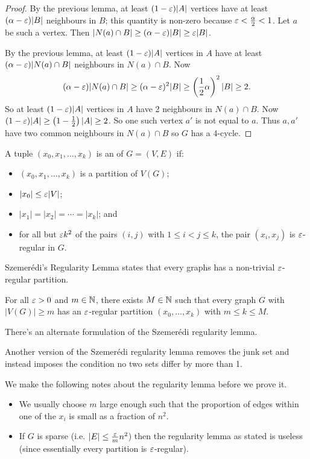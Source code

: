 \documentclass[main.tex]{subfiles}
\begin{document}
\begin{proof}
  By the previous lemma, at least $(1 - \varepsilon)|A|$ vertices have at least
  $(\alpha - \varepsilon)|B|$ neighbours in $B$; this quantity is non-zero because
  $\varepsilon < \frac\alpha 2 < 1$.
  Let $a$ be such a vertex.
  Then $|N(a)\cap B|\geq(\alpha - \varepsilon)|B|\geq\varepsilon|B|$.

  By the previous lemma, at least $(1 - \varepsilon)|A|$ vertices in $A$ have at least
  $(\alpha - \varepsilon)|N(a)\cap B|$ neighbours in $N(a)\cap B$.
  Now
  \[
    (\alpha - \varepsilon)|N(a)\cap B|\geq(\alpha-\varepsilon)^2|B|
    \geq\left(\frac{1}{2}\alpha\right)^2|B|\geq 2.
  \]
  So at least $(1-\varepsilon)|A|$ vertices in $A$ have 2 neighbours in $N(a)\cap B$.
  Now $(1 - \varepsilon)|A|\geq\left(1 - \frac{1}{2}\right)|A|\geq 2$.
  So one such vertex $a'$ is not equal to $a$.
  Thus $a,a'$ have two common neighbours in $N(a)\cap B$ so $G$ has a 4-cycle.
\end{proof}
\begin{definition*}
  A tuple $(x_0,x_1,\ldots,x_k)$ is an
   of $G = (V,E)$ if:
  \begin{itemize}
    \item $(x_0,x_1,\ldots,x_k)$ is a partition of $V(G)$;
    \item $|x_0|\leq\varepsilon|V|$;
    \item $|x_1| = |x_2| = \cdots = |x_k|$; and
    \item for all but $\varepsilon k^2$ of the pairs $(i,j)$ with $1\leq i < j\leq k$,
      the pair $(x_i,x_j)$ is $\varepsilon$-regular in $G$.
  \end{itemize}
\end{definition*}
Szemer\'edi's Regularity Lemma states that every graphs has a non-trivial
$\varepsilon$-regular partition.
\begin{lemma}
  \th\label{lem:regularity-lemma}
  For all $\varepsilon > 0$ and $m\in\mathbb N$, there exists $M\in\mathbb N$ such that every graph
  $G$ with $|V(G)|\geq m$ has an $\varepsilon$-regular partition
  $(x_0,\ldots,x_k)$ with $m\leq k\leq M$.
\end{lemma}
There's an alternate formulation of the Szemer\'edi regularity lemma.
\begin{remark*}
  Another version of the Szemer\'edi regularity lemma removes the junk set
  and instead imposes the condition no two sets differ by more than 1.
\end{remark*}
We make the following notes about the regularity lemma before we prove it.
\begin{note*}
  \listhack
  \begin{itemize}
    \item We usually choose $m$ large enough such that the proportion of edges
      within one of the $x_i$ is small as a fraction of $n^2$.

    \item If $G$ is sparse (i.e. $|E|\leq\frac{\varepsilon}{m}n^2$) then the regularity
      lemma as stated is useless
      (since essentially every partition is $\varepsilon$-regular).
  \end{itemize}
\end{note*}
\end{document}

